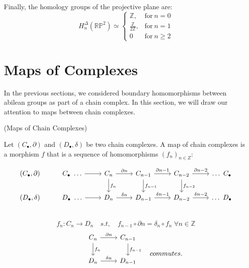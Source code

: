 \documentclass[11pt,a4paper]{report}
\begin{document}
Finally, the homology groups of the projective plane are: 
		\[
	  		H_n^\Delta(\mathbb{R} \mathbb{P}^2) \simeq \left\{
			      \begin{array}{rl}
			     \mathbb{Z}, & \textrm{for} \: n = 0\\
			     \frac{\mathbb{Z}}{2\mathbb{Z}}, & \textrm{for} \: n = 1\\
                        0 & \textrm{for} \: n \geqslant 2
			      \end{array}
			 \right.
	  	\]


		
    \section{Maps of Complexes}
    In the previous sections, we considered boundary homomorphisms between abilean groups as part of a chain complex. In this section, we will draw our attention to maps between chain complexes.
    
    \begin{defn}(Maps of Chain Complexes)

     Let $(C_\bullet, \partial)$ and $(D_\bullet, \delta)$ be two chain complexes. 
     A map of chain complexes is a morphism $f$ that is a sequence of homomorphisms $(f_n)_{n  \in  Z}$:
     
            \[
                  \begin{tikzcd}[ampersand replacement=\&]
                    (C_\bullet, \partial) \& C_\bullet \ \ldots \arrow[r]  \& C_n \arrow[r, "\partial n"] \arrow[d, "{f_n}"]   \& C_{n-1} \arrow[r, "\partial {n-1}"] \arrow[d, "f_{n-1}"]   \& C_{n-2} \arrow[r, "\partial {n-2}"] \arrow[d, "f_{n-2}"]    \& \ldots \ C_\bullet \\
                    (D_\bullet, \delta) \& D_\bullet \ \ldots \arrow[r]    \& D_n \arrow[r, "\delta n"]    \& D_{n-1} \arrow[r, "\delta {n-1}"]    \& D_{n-2} \arrow[r, "\delta {n-2}"]   \& \ldots \ D_\bullet \\
                  \end{tikzcd}
                \]
            \[
                  f_n : C_n \rightarrow D_n \quad s.t, \quad   f_{n-1} \circ \partial n = \delta_n \circ f_n \; \forall n \in \mathbb{Z}
                  \]
                   \[
                  \begin{tikzcd}[ampersand replacement=\&]
                    \& C_n \arrow[r, "\partial n"] \arrow[d, "{f_n}"]    \& C_{n-1} \arrow[d, "{f_{n-1}}"] \\
                    \& D_n \arrow[r, "\delta n"]    \& D_{n-1} \\
                  \end{tikzcd} 
                   \quad         commutes.
                \]


    \end{defn}
\end{document}
